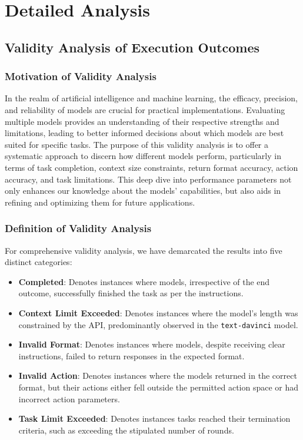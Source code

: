 \section{Detailed Analysis}

\subsection{Validity Analysis of Execution Outcomes}
\label{app:validation}

\subsubsection{Motivation of Validity Analysis}

In the realm of artificial intelligence and machine learning, the efficacy, precision, and reliability of models are crucial for practical implementations. Evaluating multiple models provides an understanding of their respective strengths and limitations, leading to better informed decisions about which models are best suited for specific tasks. The purpose of this validity analysis is to offer a systematic approach to discern how different models perform, particularly in terms of task completion, context size constraints, return format accuracy, action accuracy, and task limitations. This deep dive into performance parameters not only enhances our knowledge about the models' capabilities, but also aids in refining and optimizing them for future applications.

\subsubsection{Definition of Validity Analysis}

For comprehensive validity analysis, we have demarcated the results into five distinct categories:

\begin{itemize}
    \item \textbf{Completed}: Denotes instances where models, irrespective of the end outcome, successfully finished the task as per the instructions.
    
    \item \textbf{Context Limit Exceeded}: Denotes instances where the model's length was constrained by the API, predominantly observed in the \texttt{text-davinci} model.
    
    \item \textbf{Invalid Format}: Denotes instances where models, despite receiving clear instructions, failed to return responses in the expected format.
    
    \item \textbf{Invalid Action}: Denotes instances where the models returned in the correct format, but their actions either fell outside the permitted action space or had incorrect action parameters.
    
    \item \textbf{Task Limit Exceeded}: Denotes instances tasks reached their termination criteria, such as exceeding the stipulated number of rounds.
\end{itemize}

